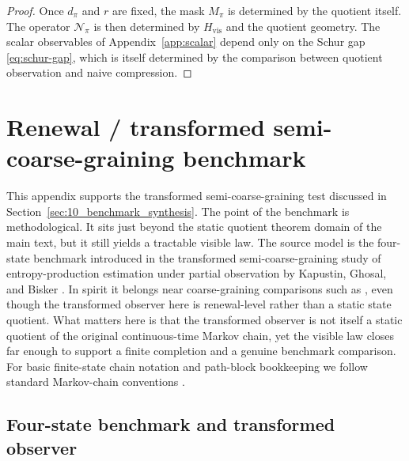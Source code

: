 \documentclass[11pt]{article}
\numberwithin{equation}{section}
\theoremstyle{thmcompact}
\theoremstyle{remark}
\begin{document}
\begin{proof}
Once $d_\pi$ and $r$ are fixed, the mask $M_\pi$ is determined by the quotient itself. The operator $\mathcal N_\pi$ is then determined by $H_{\mathrm{vis}}$ and the quotient geometry. The scalar observables of Appendix~\ref{app:scalar} depend only on the Schur gap \eqref{eq:schur-gap}, which is itself determined by the comparison between quotient observation and naive compression.
\end{proof}

\section{Renewal / transformed semi-coarse-graining benchmark}\label{app:renewal}

This appendix supports the transformed semi-coarse-graining test discussed in Section~\ref{sec:10_benchmark_synthesis}. The point of the benchmark is methodological. It sits just beyond the static quotient theorem domain of the main text, but it still yields a tractable visible law. The source model is the four-state benchmark introduced in the transformed semi-coarse-graining study of entropy-production estimation under partial observation by Kapustin, Ghosal, and Bisker \cite{KapustinGhosalBisker2024}. In spirit it belongs near coarse-graining comparisons such as \cite{TezaStella2020}, even though the transformed observer here is renewal-level rather than a static state quotient. What matters here is that the transformed observer is not itself a static quotient of the original continuous-time Markov chain, yet the visible law closes far enough to support a finite completion and a genuine benchmark comparison. For basic finite-state chain notation and path-block bookkeeping we follow standard Markov-chain conventions \cite{KemenySnell1976}.

\subsection{Four-state benchmark and transformed observer}
\end{document}
